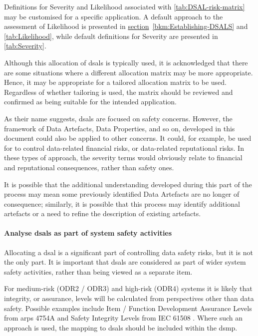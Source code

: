 Definitions for Severity and Likelihood associated with \autoref{tab:DSAL-risk-matrix} may be customised for a specific application. A default approach to the assessment of Likelihood is presented in
\hyperref[bkm:Establishing-DSALS]{section}~\ref{bkm:Establishing-DSALS} %
and \autoref{tab:Likelihood}, while default definitions for Severity are presented in \autoref{tab:Severity}.

Although this allocation of \glspl{dsal} is typically used, it is acknowledged that there are some situations where a different allocation matrix may be more appropriate. Hence, it may be appropriate for a tailored allocation matrix to be used. Regardless of whether tailoring is used, the matrix should be reviewed and confirmed as being suitable for the intended application.

As their name suggests, \glspl{dsal} are focused on safety concerns. However, the framework of Data Artefacts, Data Properties, and so on, developed in this document could also be applied to other concerns. It could, for example, be used for to control data-related financial risks, or data-related reputational risks. In these types of approach, the severity terms would obviously relate to financial and reputational consequences, rather than safety ones.

It is possible that the additional understanding developed during this part of the process may mean some previously identified Data Artefacts are no longer of consequence; similarly, it is possible that this process may identify additional artefacts or a need to refine the description of existing artefacts.

\paragraph{Analyse \glspl{dsal} as part of system safety activities}
\label{bkm:activities:analyse:partofsystemsafetyactivities}
Allocating a \gls{dsal} is a significant part of controlling data safety risks, but it is not the only part. It is important that \glspl{dsal} are considered as part of wider system safety activities, rather than being viewed as a separate item.

For medium-risk (ODR2 / ODR3) and high-risk (ODR4) systems it is likely that integrity, or assurance, levels will be calculated from perspectives other than data safety. Possible examples include Item / Function Development Assurance Levels from \glspl{arp} 4754A \cite{citation:arp4754a2010guidelines} and Safety Integrity Levels from IEC 61508 \cite{citation:iec615083}.
Where such an approach is used, the mapping to \glspl{dsal} should be included within the \gls{dsmp}.

